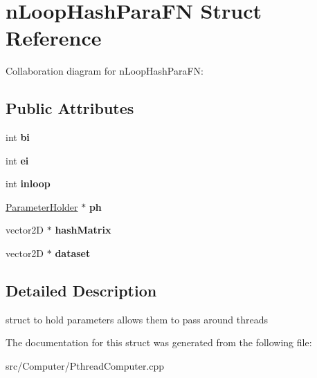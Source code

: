 \hypertarget{structnLoopHashParaFN}{}\section{n\+Loop\+Hash\+Para\+FN Struct Reference}
\label{structnLoopHashParaFN}


Collaboration diagram for n\+Loop\+Hash\+Para\+FN\+:
\subsection*{Public Attributes}
\begin{DoxyCompactItemize}
\item 
int {\bfseries bi}\hypertarget{structnLoopHashParaFN_a1ffd623a3d954e80c701c736247f8d27}{}\label{structnLoopHashParaFN_a1ffd623a3d954e80c701c736247f8d27}

\item 
int {\bfseries ei}\hypertarget{structnLoopHashParaFN_a6626b21b21437aaf348b236a54ebc60d}{}\label{structnLoopHashParaFN_a6626b21b21437aaf348b236a54ebc60d}

\item 
int {\bfseries inloop}\hypertarget{structnLoopHashParaFN_afa45206773986985f1139b1c8ede8802}{}\label{structnLoopHashParaFN_afa45206773986985f1139b1c8ede8802}

\item 
\hyperlink{structParameterHolder}{Parameter\+Holder} $\ast$ {\bfseries ph}\hypertarget{structnLoopHashParaFN_ae614c98271a3bf9f9120af0bb96b829f}{}\label{structnLoopHashParaFN_ae614c98271a3bf9f9120af0bb96b829f}

\item 
vector2D $\ast$ {\bfseries hash\+Matrix}\hypertarget{structnLoopHashParaFN_abfd72baf23fa9131aba800ed7899d277}{}\label{structnLoopHashParaFN_abfd72baf23fa9131aba800ed7899d277}

\item 
vector2D $\ast$ {\bfseries dataset}\hypertarget{structnLoopHashParaFN_afbfe6879d6c59d3d180a26e7daeeccad}{}\label{structnLoopHashParaFN_afbfe6879d6c59d3d180a26e7daeeccad}

\end{DoxyCompactItemize}


\subsection{Detailed Description}
struct to hold parameters allows them to pass around threads 

The documentation for this struct was generated from the following file\+:\begin{DoxyCompactItemize}
\item 
src/\+Computer/Pthread\+Computer.\+cpp\end{DoxyCompactItemize}
